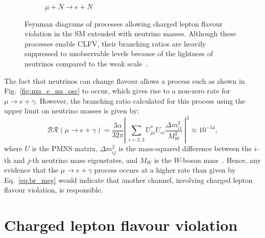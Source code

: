\begin{figure}
\begin{subfigure}[t]{0.45\textwidth}
    \caption{
        $\mu+N \rightarrow e + N$
    }
    \label{fig:mu-e_conv_SM}
\end{subfigure}
    \caption{
        Feynman diagrams of processes allowing charged lepton flavour
        violation in the SM extended with neutrino masses. Although these
        processes enable CLFV, their branching ratios are heavily suppressed to
        unobservable levels because of the lightness of
        neutrinos compared to the weak scale~\cite{BERNSTEIN201327}.}
\end{figure}

The fact that neutrinos can change flavour allows a process such as shown in
Fig.~\ref{fig:mu_e_nu_osc} to occur, which gives rise to a non-zero rate for
${\mu \rightarrow e + \gamma}$. However, the branching ratio calculated for this
process using the upper limit on neutrino masses is given by:
\begin{equation}\label{eq:br_meg}
\mathcal{BR}(\mu \rightarrow e + \gamma) = \frac{3\alpha}{32\pi} \left|\ \sum_{i=2, 3} U^*_{\mu i} U_{e i} 
\frac{\Delta m^2_{i1}}{M^2_W}  \ \right| ^2 \approx 10^{-54},
\end{equation}
where $U$ is the PMNS matrix, $\Delta m^2_{ij}$ is the mass-squared difference between the
$i$-th and $j$-th neutrino mass eigenstates, and $M_W$ is the $W$-boson
mass~\cite{BERNSTEIN201327}.
Hence, any evidence that the ${\mu \rightarrow e + \gamma}$ process occurs at a higher
rate than given by Eq.~\ref{eq:br_meg} would indicate that another channel,
involving charged lepton flavour violation, is responsible.

\section{Charged lepton flavour violation}

